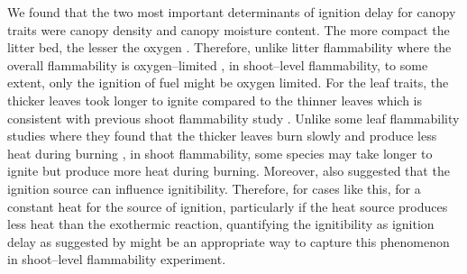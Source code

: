 \documentclass{ttuthes2007}
\begin{document}
\noindent We found that the two most important determinants of ignition delay for canopy traits were canopy density and canopy moisture content.
The more compact the litter bed, the lesser the oxygen  \citep{scarff2006leaf, van2012species, engber2012patterns, de2012leaf,cornwell2015flammability}. %
Therefore, unlike litter flammability where the overall flammability is oxygen--limited \citep{schwilk2015dimensions}, in shoot--level flammability, to some extent, only the ignition of fuel might be oxygen limited. %
For the leaf traits, the thicker leaves took longer to ignite compared to the thinner leaves which is consistent with previous shoot flammability study \citep{alam2020shoot}.  %
Unlike some leaf flammability studies where they found that the thicker leaves burn slowly and produce less heat during burning \citep{mason2016fire}, in shoot flammability, some species may take longer to ignite but produce more heat during burning. Moreover, \citet{madrigal2012evaluation} also suggested that the ignition source can influence ignitibility. Therefore, for cases like this, for a constant heat for the source of ignition, particularly if the heat source produces less heat than the exothermic reaction, quantifying the ignitibility as ignition delay as suggested by \citep{anderson1970forest} might be an appropriate way to capture this phenomenon in shoot--level flammability experiment.
\end{document}
